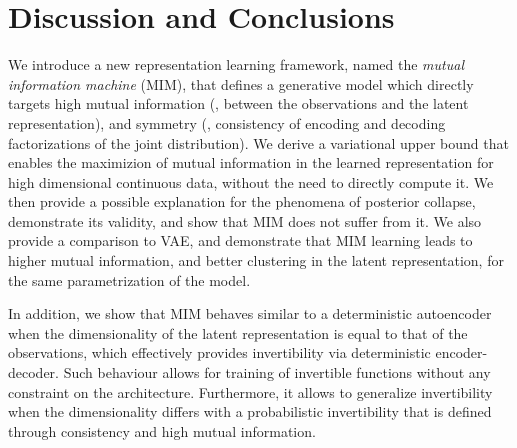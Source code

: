 


\section{Discussion and Conclusions} \label{sec:conclusion}


We introduce a new representation learning framework, named the {\em mutual information machine} (MIM), that defines a generative model which directly targets high mutual information (\ie, between the observations and the latent representation), and symmetry (\ie, consistency of encoding and decoding factorizations of the joint distribution). We derive a variational upper bound that enables the maximizion of mutual information in the learned representation for high dimensional continuous data, without the need to directly compute it. We then provide a possible explanation for the phenomena of posterior collapse, demonstrate  its validity, and show that MIM does not suffer from it. We also provide a comparison to VAE, and demonstrate that MIM learning leads to higher mutual information, and better clustering in the latent representation, for the same parametrization of the model. 

In addition, we show that MIM behaves similar to a deterministic autoencoder when the dimensionality of the latent representation is equal to that of the observations, which effectively provides invertibility via deterministic encoder-decoder. Such behaviour allows for training of invertible functions without any constraint on the architecture. Furthermore, it allows to generalize invertibility when the dimensionality differs with a probabilistic invertibility that is defined through consistency and high mutual information.

